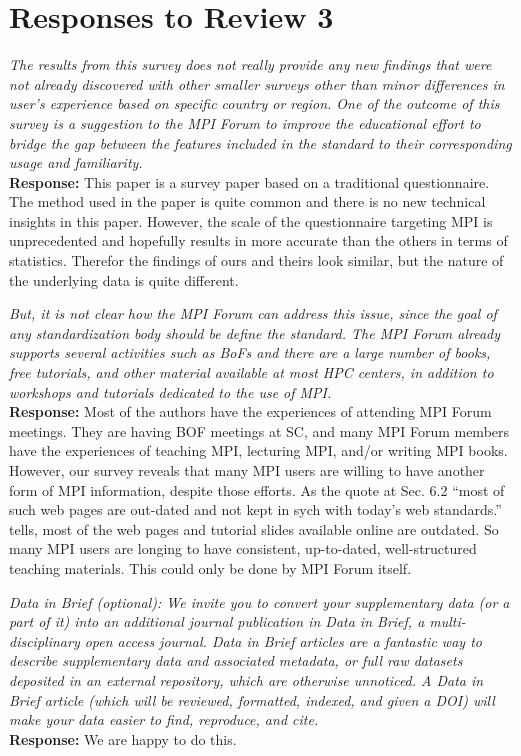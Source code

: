 \documentclass[11pt]{article}
\newcommand{\response}[2]{{\vspace{5mm}\noindent{\bf Comment:} \em #1}\\%
  {\bf Response:} #2}
\begin{document}
\section*{Responses to Review 3}

\response{The results from this survey does not really provide any
  new findings that were not already discovered with other smaller
  surveys other than minor differences in user's experience based on
  specific country or region. One of the outcome of this survey is a
  suggestion to the MPI Forum to improve the educational effort to
  bridge the gap between the features included in the standard to
  their corresponding usage and familiarity.}
         {This paper is a survey paper based on a traditional
           questionnaire.  The method used in the paper is quite
           common and there is no new technical insights in this paper.
           However, the scale of the 
           questionnaire targeting MPI is unprecedented and hopefully
           results in more accurate than the others in terms of
           statistics.
           Therefor the findings of ours and theirs look similar, but
           the nature of the underlying data is quite different.
}

\response{But, it is not clear how the MPI Forum can address this
  issue, since the goal of any standardization body should be define
  the standard. The MPI Forum already supports several activities such
  as BoFs and there are a large number of books, free tutorials, and
  other material available at most HPC centers, in addition to
  workshops and tutorials dedicated to the use of MPI.}
{Most of the authors have the experiences of attending MPI Forum
  meetings.  They are having BOF meetings at SC, and many MPI Forum
  members have the experiences of teaching MPI, lecturing MPI, and/or
  writing MPI books. However, our survey reveals that many MPI users
  are willing to have another form of MPI information, despite those
  efforts. As the quote at Sec. 6.2 ``most of such web pages are
  out-dated and not kept in sych with today’s web standards.'' tells,
  most of the web pages and tutorial slides available online are
  outdated. So many MPI users are longing to have consistent,
  up-to-dated, well-structured teaching materials. This could only be done
  by MPI Forum itself. 
}


\response{Data in Brief (optional): We invite you to convert your
  supplementary data (or a part of it) into an additional journal
  publication in Data in Brief, a multi-disciplinary open access
  journal. Data in Brief articles are a fantastic way to describe
  supplementary data and associated metadata, or full raw datasets
  deposited in an external repository, which are otherwise
  unnoticed. A Data in Brief article (which will be reviewed,
  formatted, indexed, and given a DOI) will make your data easier to
  find, reproduce, and cite.}
{We are happy to do this.}
\end{document}
